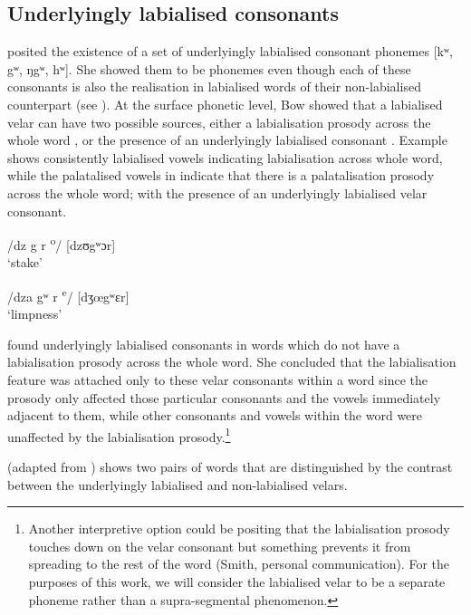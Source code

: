 \subsection{Underlyingly labialised consonants}\label{sec:2.2.2}
\hypertarget{RefHeading1210481525720847}{}
\citet{Bow1997c} posited the existence of a set of underlyingly labialised consonant phonemes [kʷ, gʷ, ŋgʷ, hʷ]. She showed them to be phonemes even though each of these consonants is also the realisation in labialised words of their non-labialised counterpart (see ). At the surface phonetic level, Bow showed that a labialised velar can have two possible sources, either a labialisation prosody across the whole word , or the presence of an underlyingly labialised consonant . Example  shows consistently labialised vowels indicating labialisation across whole word, while the palatalised vowels in  indicate that there is a palatalisation prosody across the whole word; with the presence of an underlyingly labialised velar consonant.


\ea \label{ex:2:24}
\textup{/dz g r \textsuperscript{o}}\textup{/ \hspace{15pt} [dzʊgʷɔr]}\\
\glt  ‘stake’ 
\z

\ea \label{ex:2:25}
\textup{/}\textup{dza gʷ r \textsuperscript{e}}\textup{/ \hspace{5pt} [dʒœgʷɛr]}\\
\glt  ‘limpness’ 
\z

\citet{Bow1997c} found underlyingly labialised consonants in words which do not have a labialisation prosody across the whole word.  She concluded that the labialisation feature was attached only to these velar consonants within a word since the prosody only affected those particular consonants and the vowels immediately adjacent to them, while other consonants and vowels within the word were unaffected by the labialisation prosody.\footnote{Another interpretive option could be positing that the labialisation prosody touches down on the velar consonant but something prevents it from spreading to the rest of the word (Smith, personal communication). For the purposes of this work, we will consider the labialised velar to be a separate phoneme rather than a supra-segmental phenomenon.}  

 (adapted from \citealt{Bow1997c}) shows two pairs of words that are distinguished by the contrast between the underlyingly labialised and non-labialised velars.


